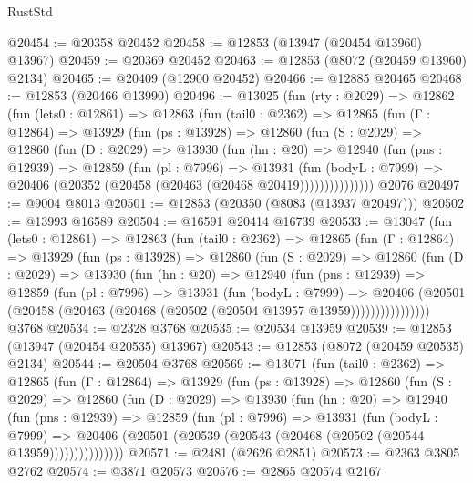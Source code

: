 \begin{lexlean}{RustStd}
\begin{coremodule}
@20454 := @20358 @20452
@20458 := @12853 (@13947 (@20454 @13960) @13967)
@20459 := @20369 @20452
@20463 := @12853 (@8072 (@20459 @13960) @2134)
@20465 := @20409 (@12900 @20452)
@20466 := @12885 @20465
@20468 := @12853 (@20466 @13990)
@20496 := @13025
    (fun (rty : @2029) =>
    @12862
      (fun (lets0 : @12861) =>
      @12863
        (fun (tail0 : @2362) =>
        @12865
          (fun (Γ : @12864) =>
          @13929
            (fun (ps : @13928) =>
            @12860
              (fun (S : @2029) =>
              @12860
                (fun (D : @2029) =>
                @13930
                  (fun (hn : @20) =>
                  @12940
                    (fun (pns : @12939) =>
                    @12859
                      (fun (pl : @7996) =>
                      @13931
                        (fun (bodyL : @7999) =>
                        @20406 (@20352 (@20458 (@20463 (@20468 @20419)))))))))))))))
    @2076
@20497 := @9004 @8013
@20501 := @12853 (@20350 (@8083 (@13937 @20497)))
@20502 := @13993 @16589
@20504 := @16591 @20414 @16739
@20533 := @13047
    (fun (lets0 : @12861) =>
    @12863
      (fun (tail0 : @2362) =>
      @12865
        (fun (Γ : @12864) =>
        @13929
          (fun (ps : @13928) =>
          @12860
            (fun (S : @2029) =>
            @12860
              (fun (D : @2029) =>
              @13930
                (fun (hn : @20) =>
                @12940
                  (fun (pns : @12939) =>
                  @12859
                    (fun (pl : @7996) =>
                    @13931
                      (fun (bodyL : @7999) =>
                      @20406
                        (@20501
                          (@20458 (@20463 (@20468 (@20502 (@20504 @13957 @13959))))))))))))))))
    @3768
@20534 := @2328 @3768
@20535 := @20534 @13959
@20539 := @12853 (@13947 (@20454 @20535) @13967)
@20543 := @12853 (@8072 (@20459 @20535) @2134)
@20544 := @20504 @3768
@20569 := @13071
    (fun (tail0 : @2362) =>
    @12865
      (fun (Γ : @12864) =>
      @13929
        (fun (ps : @13928) =>
        @12860
          (fun (S : @2029) =>
          @12860
            (fun (D : @2029) =>
            @13930
              (fun (hn : @20) =>
              @12940
                (fun (pns : @12939) =>
                @12859
                  (fun (pl : @7996) =>
                  @13931
                    (fun (bodyL : @7999) =>
                    @20406 (@20501 (@20539 (@20543 (@20468 (@20502 (@20544 @13959)))))))))))))))
@20571 := @2481 (@2626 @2851)
@20573 := @2363 @3805 @2762
@20574 := @3871 @20573
@20576 := @2865 @20574 @2167

\end{coremodule}
\end{lexlean}
